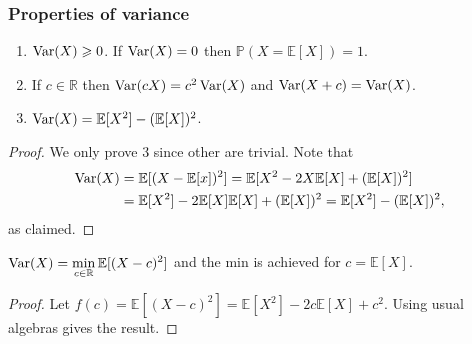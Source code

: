 \subsubsection*{Properties of variance}
\begin{proposition}
    \begin{enumerate}
        \item $ \operatorname{Var}(X)\geqslant 0 $. If $ \operatorname{Var}(X)=0 $ then $ \mathbb{P}(X=\mathbb{E}[X])=1 $.
        \item If $c\in \mathbb{R}$ then $ \operatorname{Var}(cX)=c^2\operatorname{Var}(X) $ and $ \operatorname{Var}(X+c)=\operatorname{Var}(X) $.
        \item $ \operatorname{Var}(X)=\mathbb{E}[X^2]-(\mathbb{E}[X])^2 $.
    \end{enumerate}
\end{proposition}
\begin{proof}
    We only prove 3 since other are trivial. Note that 
    \begin{align*}
        \operatorname{Var}(X)&= \mathbb{E}[(X-\mathbb{E}[x])^2] = \mathbb{E}[X^2-2X\mathbb{E}[X]+(\mathbb{E}[X])^2]\\ 
        &= \mathbb{E}[X^2]-2\mathbb{E}[X]\mathbb{E}[X]+(\mathbb{E}[X])^2=\mathbb{E}[X^2]-(\mathbb{E}[X])^2,
    \end{align*}
    as claimed.
\end{proof}

\begin{proposition}
    $ \displaystyle \operatorname{Var}(X) = \min_{c\in \mathbb{R}}\mathbb{E}[(X-c)^2] $ and the min is achieved for $ c=\mathbb{E}[X] $.
\end{proposition}
\begin{proof}
    Let $ f(c)=\mathbb{E}[(X-c)^2] = \mathbb{E}[X^2]-2c\mathbb{E}[X]+c^2 $. Using usual algebras gives the result.
\end{proof}

